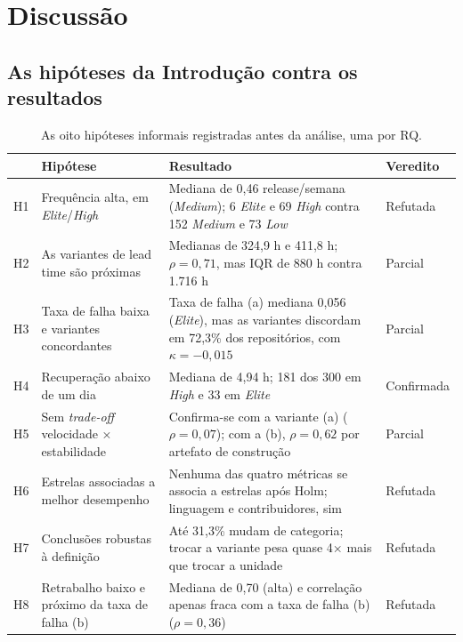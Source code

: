 \section{Discussão}
\label{sec:discussao}

\subsection{As hipóteses da Introdução contra os resultados}

\begin{table}[ht]
\centering
\caption{As oito hipóteses informais registradas antes da análise, uma por RQ.}
\label{tab:hipoteses}
\footnotesize
\begin{tabular}{p{0.7cm}p{4.4cm}p{5.4cm}l}
\toprule
 & \textbf{Hipótese} & \textbf{Resultado} & \textbf{Veredito} \\
\midrule
H1 & Frequência alta, em \emph{Elite}/\emph{High} &
     Mediana de 0,46 release/semana (\emph{Medium}); 6 \emph{Elite} e 69
     \emph{High} contra 152 \emph{Medium} e 73 \emph{Low} & Refutada \\
H2 & As variantes de lead time são próximas &
     Medianas de 324,9 h e 411,8 h; $\rho = 0{,}71$, mas IQR de 880 h contra 1.716 h &
     Parcial \\
H3 & Taxa de falha baixa e variantes concordantes &
     Taxa de falha (a) mediana 0,056 (\emph{Elite}), mas as variantes discordam em 72,3\% dos
     repositórios, com $\kappa = -0{,}015$ & Parcial \\
H4 & Recuperação abaixo de um dia &
     Mediana de 4,94 h; 181 dos 300 em \emph{High} e 33 em \emph{Elite} &
     Confirmada \\
H5 & Sem \emph{trade-off} velocidade × estabilidade &
     Confirma-se com a variante (a) ($\rho = 0{,}07$); com a (b), $\rho = 0{,}62$ por
     artefato de construção & Parcial \\
H6 & Estrelas associadas a melhor desempenho &
     Nenhuma das quatro métricas se associa a estrelas após Holm; linguagem e
     contribuidores, sim & Refutada \\
H7 & Conclusões robustas à definição &
     Até 31,3\% mudam de categoria; trocar a variante pesa quase 4× mais que trocar a
     unidade & Refutada \\
H8 & Retrabalho baixo e próximo da taxa de falha (b) &
     Mediana de 0,70 (alta) e correlação apenas fraca com a taxa de falha (b)
     ($\rho = 0{,}36$) & Refutada \\
\bottomrule
\end{tabular}
\end{table}

